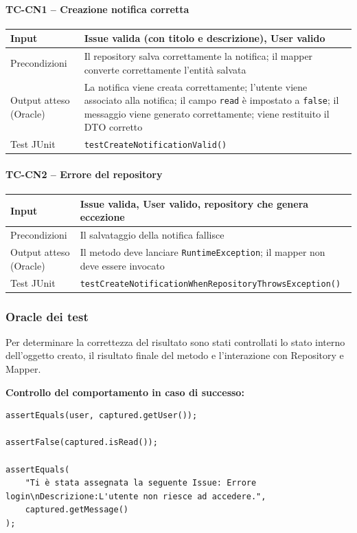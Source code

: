 \documentclass[a4paper,12pt]{article}
\begin{document}
\paragraph{TC-CN1 -- Creazione notifica corretta}
\label{sec:TC-CN1}
\begin{longtable}{|p{4cm}|p{10.3cm}|}
\hline
Input & Issue valida (con titolo e descrizione), User valido \\ \hline
Precondizioni & Il repository salva correttamente la notifica; il mapper converte correttamente l'entità salvata \\ \hline
Output atteso (Oracle) & La notifica viene creata correttamente; l'utente viene associato alla notifica; il campo \texttt{read} è impostato a \texttt{false}; il messaggio viene generato correttamente; viene restituito il DTO corretto \\ \hline
Test JUnit & \texttt{testCreateNotificationValid()} \\ \hline
\end{longtable}

\paragraph{TC-CN2 -- Errore del repository}
\label{sec:TC-CN2}
\begin{longtable}{|p{4cm}|p{10.3cm}|}
\hline
Input & Issue valida, User valido, repository che genera eccezione \\ \hline
Precondizioni & Il salvataggio della notifica fallisce \\ \hline
Output atteso (Oracle) & Il metodo deve lanciare \texttt{RuntimeException}; il mapper non deve essere invocato \\ \hline
Test JUnit & \texttt{testCreateNotificationWhenRepositoryThrowsException()} \\ \hline
\end{longtable}

\subsubsection{Oracle dei test}
Per determinare la correttezza del risultato sono stati controllati lo stato interno dell'oggetto creato, il risultato finale del metodo e l'interazione con Repository e Mapper.

\textbf{Controllo del comportamento in caso di successo:}
\begin{lstlisting}
assertEquals(user, captured.getUser());

assertFalse(captured.isRead());

assertEquals(
    "Ti è stata assegnata la seguente Issue: Errore login\nDescrizione:L'utente non riesce ad accedere.",
    captured.getMessage()
);
\end{lstlisting}
\end{document}
